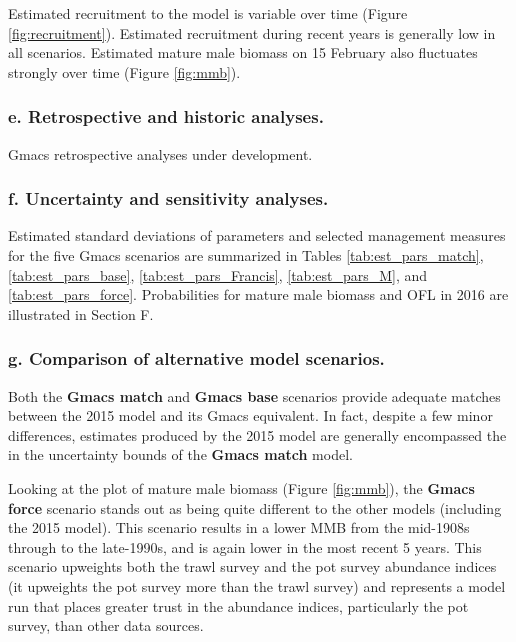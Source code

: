 \documentclass[]{article}
\begin{document}
Estimated recruitment to the model is variable over time (Figure
\ref{fig:recruitment}). Estimated recruitment during recent years is
generally low in all scenarios. Estimated mature male biomass on 15
February also fluctuates strongly over time (Figure \ref{fig:mmb}).

\subsubsection{e. Retrospective and historic
analyses.}\label{e.-retrospective-and-historic-analyses.}

Gmacs retrospective analyses under development.

\subsubsection{f. Uncertainty and sensitivity
analyses.}\label{f.-uncertainty-and-sensitivity-analyses.}

Estimated standard deviations of parameters and selected management
measures for the five Gmacs scenarios are summarized in Tables
\ref{tab:est_pars_match}, \ref{tab:est_pars_base},
\ref{tab:est_pars_Francis}, \ref{tab:est_pars_M}, and
\ref{tab:est_pars_force}. Probabilities for mature male biomass and OFL
in 2016 are illustrated in Section F.

\subsubsection{g. Comparison of alternative model
scenarios.}\label{g.-comparison-of-alternative-model-scenarios.}

Both the \textbf{Gmacs match} and \textbf{Gmacs base} scenarios provide
adequate matches between the 2015 model and its Gmacs equivalent. In
fact, despite a few minor differences, estimates produced by the 2015
model are generally encompassed the in the uncertainty bounds of the
\textbf{Gmacs match} model.

Looking at the plot of mature male biomass (Figure \ref{fig:mmb}), the
\textbf{Gmacs force} scenario stands out as being quite different to the
other models (including the 2015 model). This scenario results in a
lower MMB from the mid-1908s through to the late-1990s, and is again
lower in the most recent 5 years. This scenario upweights both the trawl
survey and the pot survey abundance indices (it upweights the pot survey
more than the trawl survey) and represents a model run that places
greater trust in the abundance indices, particularly the pot survey,
than other data sources.
\end{document}
